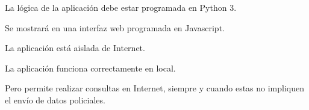   \begin{nonfunctional}
    \item La lógica de la aplicación debe estar programada en Python 3.
    \item Se mostrará en una interfaz web programada en Javascript.
    
    \item La aplicación está aislada de Internet.
    \begin{nonfunctional}
      \item La aplicación funciona correctamente en local.
      \item Pero permite realizar consultas en Internet, siempre y cuando estas no impliquen el envío de datos policiales.
    \end{nonfunctional}
  \end{nonfunctional}